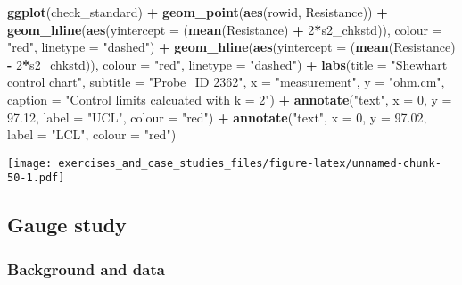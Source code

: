 \documentclass[]{book}
\newenvironment{Shaded}{\begin{snugshade}}{\end{snugshade}}
\newcommand{\DataTypeTok}[1]{\textcolor[rgb]{0.13,0.29,0.53}{#1}}
\newcommand{\DecValTok}[1]{\textcolor[rgb]{0.00,0.00,0.81}{#1}}
\newcommand{\FloatTok}[1]{\textcolor[rgb]{0.00,0.00,0.81}{#1}}
\newcommand{\KeywordTok}[1]{\textcolor[rgb]{0.13,0.29,0.53}{\textbf{#1}}}
\newcommand{\NormalTok}[1]{#1}
\newcommand{\OperatorTok}[1]{\textcolor[rgb]{0.81,0.36,0.00}{\textbf{#1}}}
\newcommand{\StringTok}[1]{\textcolor[rgb]{0.31,0.60,0.02}{#1}}
\theoremstyle{definition}
\theoremstyle{definition}
\theoremstyle{definition}
\theoremstyle{remark}
\begin{document}
\begin{Shaded}
\begin{Highlighting}[]
\KeywordTok{ggplot}\NormalTok{(check_standard) }\OperatorTok{+}
\StringTok{  }\KeywordTok{geom_point}\NormalTok{(}\KeywordTok{aes}\NormalTok{(rowid, Resistance)) }\OperatorTok{+}
\StringTok{  }\KeywordTok{geom_hline}\NormalTok{(}\KeywordTok{aes}\NormalTok{(}\DataTypeTok{yintercept =}\NormalTok{ (}\KeywordTok{mean}\NormalTok{(Resistance) }\OperatorTok{+}\StringTok{ }\DecValTok{2}\OperatorTok{*}\NormalTok{s2_chkstd)), }\DataTypeTok{colour =} \StringTok{"red"}\NormalTok{, }\DataTypeTok{linetype =} \StringTok{"dashed"}\NormalTok{) }\OperatorTok{+}
\StringTok{  }\KeywordTok{geom_hline}\NormalTok{(}\KeywordTok{aes}\NormalTok{(}\DataTypeTok{yintercept =}\NormalTok{ (}\KeywordTok{mean}\NormalTok{(Resistance) }\OperatorTok{-}\StringTok{ }\DecValTok{2}\OperatorTok{*}\NormalTok{s2_chkstd)), }\DataTypeTok{colour =} \StringTok{"red"}\NormalTok{, }\DataTypeTok{linetype =} \StringTok{"dashed"}\NormalTok{) }\OperatorTok{+}
\StringTok{  }\KeywordTok{labs}\NormalTok{(}\DataTypeTok{title =}  \StringTok{"Shewhart control chart"}\NormalTok{, }\DataTypeTok{subtitle =} \StringTok{"Probe_ID 2362"}\NormalTok{, }\DataTypeTok{x =} \StringTok{"measurement"}\NormalTok{, }\DataTypeTok{y =} \StringTok{"ohm.cm"}\NormalTok{, }\DataTypeTok{caption =} \StringTok{"Control limits calcuated with k = 2"}\NormalTok{) }\OperatorTok{+}
\StringTok{  }\KeywordTok{annotate}\NormalTok{(}\StringTok{"text"}\NormalTok{, }\DataTypeTok{x =} \DecValTok{0}\NormalTok{, }\DataTypeTok{y =} \FloatTok{97.12}\NormalTok{, }\DataTypeTok{label =} \StringTok{"UCL"}\NormalTok{, }\DataTypeTok{colour =} \StringTok{"red"}\NormalTok{) }\OperatorTok{+}
\StringTok{  }\KeywordTok{annotate}\NormalTok{(}\StringTok{"text"}\NormalTok{, }\DataTypeTok{x =} \DecValTok{0}\NormalTok{, }\DataTypeTok{y =} \FloatTok{97.02}\NormalTok{, }\DataTypeTok{label =} \StringTok{"LCL"}\NormalTok{, }\DataTypeTok{colour =} \StringTok{"red"}\NormalTok{)}
\end{Highlighting}
\end{Shaded}

\texttt{[image: exercises\_and\_case\_studies\_files/figure-latex/unnamed-chunk-50-1.pdf]}

\hypertarget{gauge-study}{%
\subsection{Gauge study}\label{gauge-study}}

\hypertarget{background-and-data-1}{%
\subsubsection{Background and data}\label{background-and-data-1}}
\end{document}
